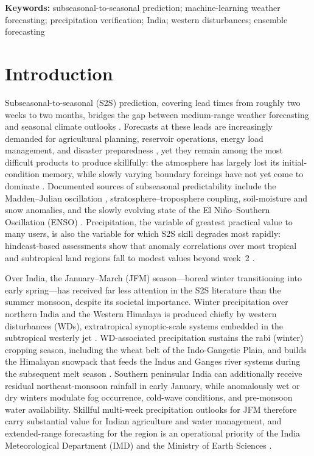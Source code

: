 \documentclass[11pt]{article}
\begin{document}
\vspace{0.5em}
\noindent\textbf{Keywords:} subseasonal-to-seasonal prediction;
machine-learning weather forecasting; precipitation verification;
India; western disturbances; ensemble forecasting

\section{Introduction}\label{sec:intro}

Subseasonal-to-seasonal (S2S) prediction, covering lead times from
roughly two weeks to two months, bridges the gap between medium-range
weather forecasting and seasonal climate outlooks
\citep{vitart2017,nas2016}. Forecasts at these leads are increasingly
demanded for agricultural planning, reservoir operations, energy load
management, and disaster preparedness \citep{white2017}, yet they
remain among the most difficult products to produce skillfully: the
atmosphere has largely lost its initial-condition memory, while slowly
varying boundary forcings have not yet come to dominate
\citep{mariotti2020}. Documented sources of subseasonal predictability
include the Madden--Julian oscillation \citep[MJO;][]{zhang2005},
stratosphere--troposphere coupling, soil-moisture and snow anomalies,
and the slowly evolving state of the El Ni\~no--Southern Oscillation
(ENSO) \citep{mariotti2020,domeisen2022}. Precipitation, the variable
of greatest practical value to many users, is also the variable for
which S2S skill degrades most rapidly: hindcast-based assessments show
that anomaly correlations over most tropical and subtropical land
regions fall to modest values beyond week~2
\citep{deandrade2019,pegion2019}.

Over India, the January--March (JFM) season---boreal winter
transitioning into early spring---has received far less attention in
the S2S literature than the summer monsoon, despite its societal
importance. Winter precipitation over northern India and the Western
Himalaya is produced chiefly by western disturbances (WDs),
extratropical synoptic-scale systems embedded in the subtropical
westerly jet \citep{dimri2015,hunt2018}. WD-associated precipitation
sustains the rabi (winter) cropping season, including the wheat belt of
the Indo-Gangetic Plain, and builds the Himalayan snowpack that feeds
the Indus and Ganges river systems during the subsequent melt season
\citep{dimri2015}. Southern peninsular India can additionally receive
residual northeast-monsoon rainfall in early January, while anomalously
wet or dry winters modulate fog occurrence, cold-wave conditions, and
pre-monsoon water availability. Skillful multi-week precipitation
outlooks for JFM therefore carry substantial value for Indian
agriculture and water management, and extended-range forecasting for
the region is an operational priority of the India Meteorological
Department (IMD) and the Ministry of Earth Sciences
\citep{rao2019,pattanaik2019}.
\end{document}
